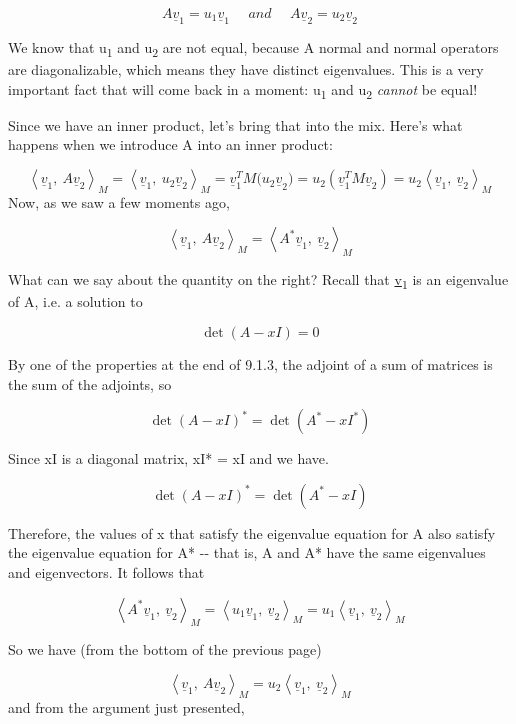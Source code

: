\documentclass[oneside,english]{amsbook}
\numberwithin{section}{chapter}
\theoremstyle{plain}
\theoremstyle{definition}
\begin{document}
\[A{\underline{v}}_{1} = u_{1}{\underline{v}}_{1}\ \ \ \ \ \ and\ \ \ \ \ \ A{\underline{v}}_{2} = u_{2}{\underline{v}}_{2}\]

We know that u\textsubscript{1} and u\textsubscript{2} are not equal,
because A normal and normal operators are diagonalizable, which means
they have distinct eigenvalues. This is a very important fact that will
come back in a moment: u\textsubscript{1} and u\textsubscript{2}
\emph{cannot} be equal!

Since we have an inner product, let's bring that into the mix. Here's
what happens when we introduce A into an inner product:

\[{\left\langle {\underline{v}}_{1},\ A{\underline{v}}_{2} \right\rangle_{M} = \left\langle {\underline{v}}_{1},\ u_{2}{\underline{v}}_{2} \right\rangle_{M}
}{= {\underline{v}}_{1}^{T}{M(u_{2}\underline{v}}_{2})
}{= u_{2}\left( {\underline{v}}_{1}^{T}M{\underline{v}}_{2} \right)
}{= u_{2}\left\langle {\underline{v}}_{1},\ {\underline{v}}_{2} \right\rangle_{M}
}\]Now, as we saw a few moments ago,

\[\left\langle {\underline{v}}_{1},\ A{\underline{v}}_{2} \right\rangle_{M} = \left\langle A^{*}{\underline{v}}_{1},\ {\underline{v}}_{2} \right\rangle_{M}\]

What can we say about the quantity on the right? Recall that
\ul{v}\textsubscript{1} is an eigenvalue of A, i.e. a solution to

\[\det(A - xI) = 0\]

By one of the properties at the end of 9.1.3, the adjoint of a sum of
matrices is the sum of the adjoints, so

\[\det(A - xI)^{*} = \det\left( A^{*} - xI^{*} \right)\]

Since xI is a diagonal matrix, xI* = xI and we have.

\[\det(A - xI)^{*} = \det\left( A^{*} - xI \right)\]

Therefore, the values of x that satisfy the eigenvalue equation for A
also satisfy the eigenvalue equation for A* -\/- that is, A and A* have
the same eigenvalues and eigenvectors. It follows that

\[\left\langle A^{*}{\underline{v}}_{1},\ {\underline{v}}_{2} \right\rangle_{M} = \left\langle u_{1}{\underline{v}}_{1},\ {\underline{v}}_{2} \right\rangle_{M}{= u_{1}\left\langle {\underline{v}}_{1},\ {\underline{v}}_{2} \right\rangle}_{M}\]

So we have (from the bottom of the previous page)

\[\left\langle {\underline{v}}_{1},\ A{\underline{v}}_{2} \right\rangle_{M} = u_{2}\left\langle {\underline{v}}_{1},\ {\underline{v}}_{2} \right\rangle_{M}
\]and from the argument just presented,
\end{document}
